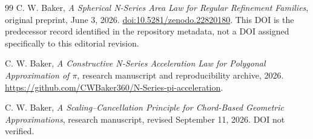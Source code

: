 \documentclass[11pt]{article}
\theoremstyle{remark}
\begin{document}
\begin{thebibliography}{99}
C. W. Baker, \emph{A Spherical N-Series Area Law for Regular Refinement Families},
original preprint, June 3, 2026.
\href{https://doi.org/10.5281/zenodo.22820180}{doi:10.5281/zenodo.22820180}.
This DOI is the predecessor record identified in the repository metadata,
not a DOI assigned specifically to this editorial revision.

C. W. Baker, \emph{A Constructive N-Series Acceleration Law for
Polygonal Approximation of $\pi$}, research manuscript and reproducibility
archive, 2026.
\url{https://github.com/CWBaker360/N-Series-pi-acceleration}.

C. W. Baker, \emph{A Scaling--Cancellation Principle for Chord-Based
Geometric Approximations}, research manuscript, revised
September 11, 2026. DOI not verified.



\end{thebibliography}
\end{document}
